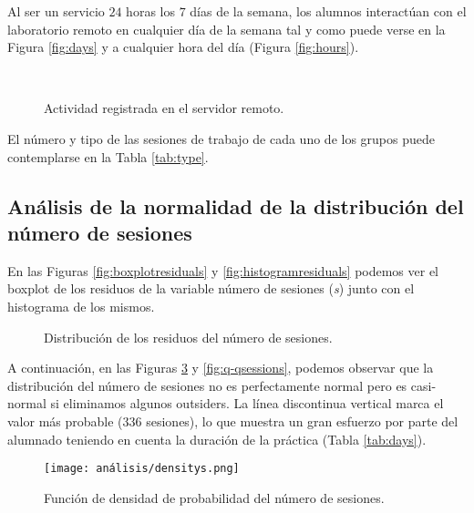 Al ser un servicio $24$ horas los $7$ días de la semana, los alumnos interactúan con el laboratorio remoto en cualquier día de la semana tal y como puede verse en la Figura \ref{fig:days} y a cualquier hora del día (Figura \ref{fig:hours}).

\begin{figure}[H]
\centering
{}\\
\caption{Actividad registrada en el servidor remoto.}
\label{fig:activity}
\end{figure}

El número y tipo de las sesiones de trabajo de cada uno de los grupos puede contemplarse en la Tabla \ref{tab:type}.

\subsection{Análisis de la normalidad de la distribución del número de sesiones}\label{sec:NormalityNumSessions}

En las Figuras \ref{fig:boxplotresiduals} y \ref{fig:histogramresiduals} podemos ver el boxplot de los residuos de la variable número de sesiones (\emph{s}) junto con el histograma de los mismos.

\begin{figure}[H]
\centering
{}\qquad
{}
\caption{Distribución de los residuos del número de sesiones.}
\label{fig:activity}
\end{figure}

A continuación, en las Figuras \ref{fig:densitysessions} y \ref{fig:q-qsessions}, podemos observar que la distribución del número de sesiones no es perfectamente normal pero es casi-normal si eliminamos algunos outsiders. La línea discontinua vertical marca el valor más probable ($336$ sesiones), lo que muestra un gran esfuerzo por parte del alumnado teniendo en cuenta la duración de la práctica (Tabla \ref{tab:days}).

\begin{figure}[H]
    \centering
    \texttt{[image: análisis/densitys.png]}
    \caption{Función de densidad de probabilidad del número de sesiones.}
    \label{fig:densitysessions}
\end{figure}


